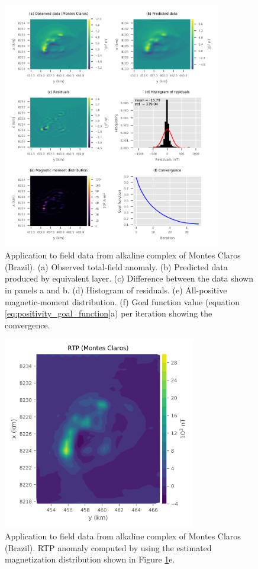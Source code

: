 \begin{figure}
	\centering
	\includegraphics[width=0.85\textwidth]{Fig/field_data_montes_claros/Fig5.png}
	\caption{Application to field data from alkaline complex of Montes Claros (Brazil). (a) Observed total-field anomaly. (b) Predicted data produced by equivalent layer. (c) Difference between the data shown in panels a and b. (d) Histogram of residuals. (e) All-positive magnetic-moment distribution. (f) Goal function value (equation \ref{eq:positivity_goal_function}a) per iteration showing the convergence.}
	\label{fig:mc_data_application}
\end{figure}

\begin{figure}
	\centering
	\includegraphics[width=0.75\textwidth]{Fig/field_data_montes_claros/Fig6.png}
	\caption{Application to field data from alkaline complex of Montes Claros (Brazil). RTP anomaly computed by using the estimated magnetization distribution shown in Figure \ref{fig:mc_data_application}e.}
	\label{fig:rtp_mc_data}
\end{figure}

